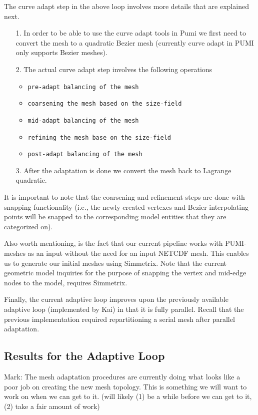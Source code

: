 \documentclass[review,12pt]{elsarticle_summary_report}
\begin{document}
The curve adapt step in the above loop involves more details that are explained next.
\begin{itemize}
  \item [1.]In order to be able to use the curve adapt tools in Pumi we first need to convert the mesh to a quadratic Bezier mesh (currently curve adapt in PUMI only supports Bezier meshes).
  \item [2.]The actual curve adapt step involves the following operations
  	\begin{itemize}
	  \item \texttt{pre-adapt balancing of the mesh}
	  \item \texttt{coarsening the mesh based on the size-field}
	  \item \texttt{mid-adapt balancing of the mesh}
	  \item \texttt{refining the mesh base on the size-field}
	  \item \texttt{post-adapt balancing of the mesh}
  	\end{itemize}
  \item [3.]After the adaptation is done we convert the mesh back to Lagrange quadratic.
\end{itemize}

It is important to note that the coarsening and refinement steps are done with snapping functionality (i.e., the newly created vertexes and Bezier interpolating points will be snapped to the corresponding model entities that they are categorized on). 


Also worth mentioning, is the fact that our current pipeline works with PUMI-meshes as an input without the need for an input NETCDF mesh. This enables us to generate our initial meshes using Simmetrix. Note that the current geometric model inquiries for the purpose of snapping the vertex and mid-edge nodes to the model, requires Simmetrix.

Finally,  the current adaptive loop improves upon the previously available adaptive loop (implemented by Kai) in that it is fully parallel. Recall that the previous implementation required repartitioning a serial mesh after parallel adaptation.

\subsection{Results for the Adaptive Loop}

\color{blue} Mark: The mesh adaptation procedures are currently doing what looks like a poor job on creating the new mesh topology. This is something we will want to work on when we can get to it. (will likely (1) be a while before we can get to it, (2) take a fair amount of work) \color{black}
\end{document}

